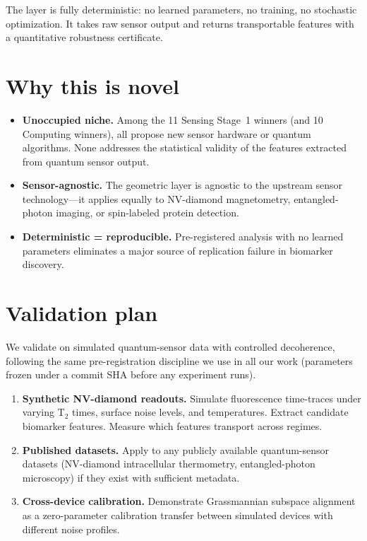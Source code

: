 \documentclass[11pt]{article}
\begin{document}
The layer is fully deterministic: no learned parameters, no training,
no stochastic optimization.  It takes raw sensor output and returns
transportable features with a quantitative robustness certificate.

\section*{Why this is novel}

\begin{itemize}
  \item \textbf{Unoccupied niche.}  Among the 11 Sensing Stage~1
    winners (and 10 Computing winners), all propose new sensor
    hardware or quantum algorithms.  None addresses the statistical
    validity of the features extracted from quantum sensor output.
  \item \textbf{Sensor-agnostic.}  The geometric layer is agnostic to
    the upstream sensor technology---it applies equally to NV-diamond
    magnetometry, entangled-photon imaging, or spin-labeled protein
    detection.
  \item \textbf{Deterministic = reproducible.}  Pre-registered
    analysis with no learned parameters eliminates a major source of
    replication failure in biomarker discovery.
\end{itemize}

\section*{Validation plan}

We validate on simulated quantum-sensor data with controlled
decoherence, following the same pre-registration discipline we use in
all our work (parameters frozen under a commit SHA before any
experiment runs).

\begin{enumerate}
  \item \textbf{Synthetic NV-diamond readouts.}  Simulate
    fluorescence time-traces under varying T$_2$ times, surface noise
    levels, and temperatures.  Extract candidate biomarker features.
    Measure which features transport across regimes.
  \item \textbf{Published datasets.}  Apply to any publicly available
    quantum-sensor datasets (NV-diamond intracellular thermometry,
    entangled-photon microscopy) if they exist with sufficient
    metadata.
  \item \textbf{Cross-device calibration.}  Demonstrate Grassmannian
    subspace alignment as a zero-parameter calibration transfer
    between simulated devices with different noise profiles.
\end{enumerate}
\end{document}

